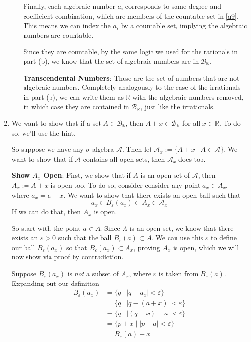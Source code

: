 \documentclass[12pt]{article}
\theoremstyle{plain}
\theoremstyle{definition}
\theoremstyle{remark}
\begin{document}
\begin{enumerate}
\begin{enumerate}
Finally, each algebraic number $a_i$ corresponds to some degree and coefficient combination, which are members of the countable set in \ref{q9}. This means we can index the $a_i$ by a countable set, implying the algebraic numbers are countable.

Since they are countable, by the same logic we used for the rationals in part (b), we know that the set of algebraic numbers are in $\mathscr{B}_\mathbb{R}$. 

\textbf{Transcendental Numbers}: These are the set of numbers that are not algebraic numbers. Completely analogously to the case of the irrationals in part (b), we can write them as $\mathbb{R}$ with the algebraic numbers removed, in which case they are contained in $\mathscr{B}_\mathbb{R}$, just like the irrationals. 


\end{enumerate} 

\newpage 
\item We want to show that if a set $A\in \mathscr{B}_\mathbb{R}$, then $A+x \in \mathscr{B}_\mathbb{R}$ for all $x\in\mathbb{R}$. To do so, we'll use the hint.

So suppose we have any $\sigma$-algebra $\mathscr{A}$. Then let $\mathscr{A}_x := \{ A + x \; | \; A \in \mathscr{A} \}$. We want to show that if $\mathscr{A}$ contains all open sets, then $\mathscr{A}_x$ does too.

\textbf{Show $A_x$ Open}: First, we show that if $A$ is an open set of $\mathscr{A}$, then $A_x := A + x$ is open too.  To do so, consider consider any point $a_x \in A_x$, where $a_x = a+x$. We want to show that there exists an open ball such that
\[
    a_x \in B_\varepsilon(a_x) \subset A_x \in \mathscr{A}_x
\]
If we can do that, then $A_x$ is open.

So start with the point $a \in A$. Since $A$ is an open set, we know that there exists an $\varepsilon>0$ such that the ball $B_\varepsilon(a) \subset A$. We can use this $\varepsilon$ to define our ball $B_\varepsilon(a_x)$ so that $B_\varepsilon(a_x)\subset A_x$, proving $A_x$ is open, which we will now show via proof by contradiction.

Suppose $B_\varepsilon(a_x)$ is \emph{not} a subset of $A_x$, where $\varepsilon$ is taken from $B_\varepsilon(a)$. Expanding out our definition
\begin{align*}
    B_\varepsilon(a_x) &= \{ q \; | \; |q - a_x| < \varepsilon \}\\
    &= \{ q  \; | \; |q - (a + x) | < \varepsilon \}\\
    &= \{ q  \; | \; |(q - x) - a  | < \varepsilon \}\\
    &= \{ p + x \; | \; |p - a  | < \varepsilon \}\\
    &= B_\varepsilon(a) + x
\end{align*}


\end{enumerate}
\end{document}
